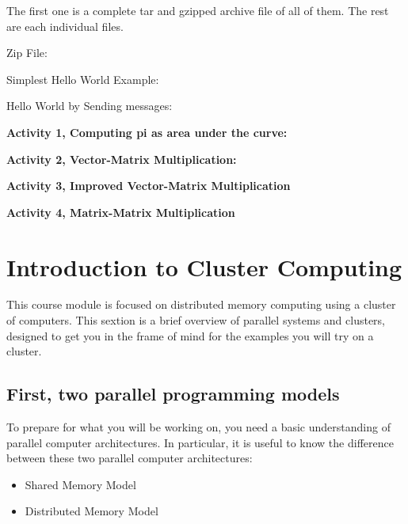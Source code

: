 \documentclass[letterpaper,10pt,openany,oneside]{sphinxmanual}
\begin{document}
The first one is a complete tar and gzipped archive file of all of them. The rest are each individual files.

Zip File:

Simplest Hello World Example:

Hello World by Sending messages:

\textbf{Activity 1, Computing pi as area under the curve:}



\textbf{Activity 2, Vector-Matrix Multiplication:}



\textbf{Activity 3, Improved Vector-Matrix Multiplication}



\textbf{Activity 4, Matrix-Matrix Multiplication}




\chapter{Introduction to Cluster Computing}
\label{IntroCluster/IntroCluster:introduction-to-cluster-computing}\label{IntroCluster/IntroCluster::doc}
This course module is focused on distributed memory computing using a cluster of computers.
This sextion is a brief overview of parallel systems and clusters, designed to get you in the frame of mind for the examples you will try on a cluster.


\section{First, two parallel programming models}
\label{IntroCluster/IntroCluster:first-two-parallel-programming-models}
To prepare for what you will be working on, you need a basic understanding of parallel computer architectures. In particular, it is useful to know the difference between these two parallel computer architectures:
\begin{itemize}
\item {} 
Shared Memory Model

\item {} 
Distributed Memory Model

\end{itemize}
\end{document}
